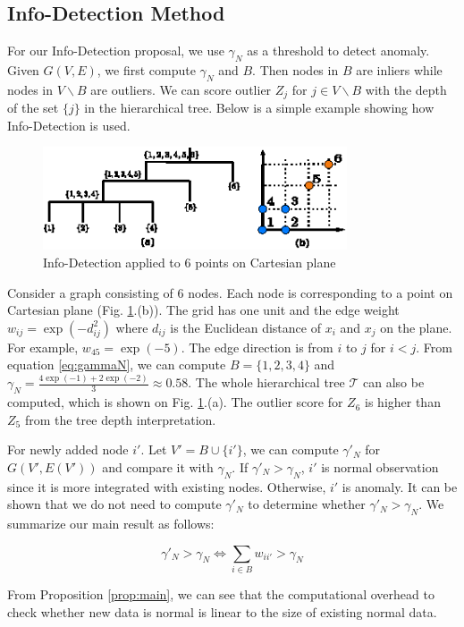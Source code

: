 \documentclass[runningheads]{llncs}
\begin{document}
\subsection{Info-Detection Method}
For our Info-Detection proposal, we use $\gamma_N$ as a threshold to detect anomaly. Given $G(V, E)$, we first compute $\gamma_N$ and $B$. Then nodes in $B$ are inliers while nodes in $V\backslash B$  are outliers. We can score outlier $Z_j$ for $j \in V\backslash B$ with the depth of the set $\{j\}$ in the hierarchical tree. Below is a simple example showing how Info-Detection is used.
\begin{example}
	\begin{figure}[!ht]
		\centering
		\includegraphics[width=9cm]{pic/outlier_example.eps}
		\caption{Info-Detection applied to 6 points on Cartesian plane}\label{fig:ex}
	\end{figure}
	Consider a graph consisting of 6 nodes. Each node is corresponding to a point on Cartesian plane (Fig. \ref{fig:ex}.(b)). The grid has one unit and the edge weight $w_{ij} = \exp(-d_{ij}^2)$ where $d_{ij}$ is the Euclidean distance of $x_i$ and $x_j$ on the plane. For example, $w_{45} = \exp(-5)$. The edge direction is from $i$ to $j$ for $i<j$. From equation \eqref{eq:gammaN}, we can compute $B=\{1,2,3,4\}$ and $\gamma_N = \frac{4\exp(-1)+2\exp(-2)}{3}\approx 0.58$. The whole hierarchical tree $\mathcal{T}$ can also be computed, which is shown on Fig. \ref{fig:ex}.(a). The outlier score for $Z_6$ is higher than $Z_5$ from the tree depth interpretation.
\end{example}
For newly added node $i'$. Let $V'=B\cup \{i'\}$, we can compute $\gamma'_N$ for $G(V', E(V'))$ and compare it with $\gamma_N$. If $\gamma'_N>\gamma_N$, $i'$ is normal observation since it is more integrated with existing nodes. Otherwise, $i'$ is anomaly. It can be shown that we do not need to compute $\gamma'_N$ to determine whether $\gamma'_N>\gamma_N$. We summarize our main result as follows:
\begin{proposition}\label{prop:main}
\begin{equation}
\gamma'_N > \gamma_N \iff  \sum_{i \in B} w_{ii'} > \gamma_N 
\end{equation}
\end{proposition}
From Proposition \ref{prop:main}, we can see that the computational overhead to check whether new data is normal is linear to the size of existing normal data. 
\end{document}
